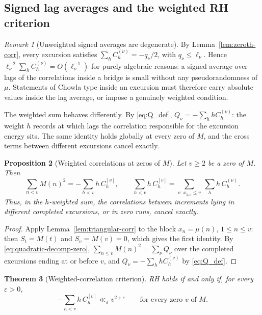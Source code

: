 \documentclass[11pt]{amsart}
\numberwithin{equation}{section}
\theoremstyle{plain}
\newtheorem{theorem}{Theorem}[section]
\newtheorem{proposition}[theorem]{Proposition}
\theoremstyle{definition}
\theoremstyle{remark}
\newtheorem{remark}[theorem]{Remark}
\newcommand{\eps}{\varepsilon}
\begin{document}
\subsection{Signed lag averages and the weighted RH criterion}

\begin{remark}[Unweighted signed averages are degenerate]
\label{rem:chowla-degenerate}
By Lemma~\ref{lem:zeroth-corr}, every excursion satisfies
$\sum_hC_h^{(\nu)}=-q_\nu/2$, with $q_\nu\le\ell_\nu$. Hence
$\ell_\nu^{-2}\sum_hC^{(\nu)}_h=O(\ell_\nu^{-1})$ for purely algebraic
reasons: a signed average over lags of the correlations inside a bridge is
small without any pseudorandomness of $\mu$. Statements of Chowla type
inside an excursion must therefore carry absolute values inside the lag
average, or impose a genuinely weighted condition.
\end{remark}

The weighted sum behaves differently. By \eqref{eq:Q_def},
$Q_\nu=-\sum_hhC_h^{(\nu)}$: the weight $h$ records at which lags the
correlation responsible for the excursion energy sits. The same identity
holds globally at every zero of $M$, and the cross terms between different
excursions cancel exactly.

\begin{proposition}[Weighted correlations at zeros of $M$]
\label{prop:weighted-global}
Let $v\ge2$ be a zero of $M$. Then
\begin{equation}
\label{eq:weighted-global}
\sum_{n<v}M(n)^2=-\sum_{h<v}h\,C^{[v]}_h,
\qquad
\sum_{h<v}h\,C^{[v]}_h=\sum_{\nu:\,x_{1,\nu}\le v}\ \sum_hh\,C^{(\nu)}_h .
\end{equation}
Thus, in the $h$-weighted sum, the correlations between increments lying in
different completed excursions, or in zero runs, cancel exactly.
\end{proposition}

\begin{proof}
Apply Lemma~\ref{lem:triangular-corr} to the block $x_n=\mu(n)$,
$1\le n\le v$: then $S_t=M(t)$ and $S_v=M(v)=0$, which gives the first
identity. By \eqref{eq:quadratic-decomp-zero}, $\sum_{n\le v}M(n)^2=\sum_\nu
Q_\nu$ over the completed excursions ending at or before $v$, and
$Q_\nu=-\sum_hhC^{(\nu)}_h$ by \eqref{eq:Q_def}.
\end{proof}

\begin{theorem}[Weighted-correlation criterion]
\label{thm:weighted-corr-RH}
RH holds if and only if, for every $\eps>0$,
\[
-\sum_{h<v}h\,C^{[v]}_h\ll_\eps v^{2+\eps}
\qquad\text{for every zero $v$ of $M$.}
\]
\end{theorem}
\end{document}
